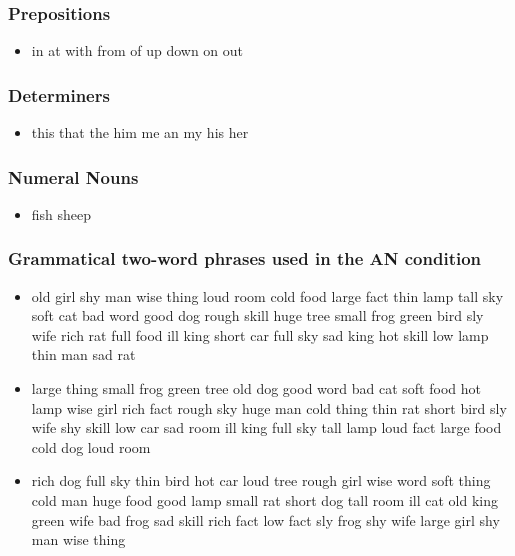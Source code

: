 \documentclass[10pt,letterpaper]{article}
\begin{document}
\begin{flushleft}
\subsubsection{Prepositions}
\begin{itemize}
  \item in
at
with
from
of
up
down
on
out
\end{itemize}

\subsubsection{Determiners}
\begin{itemize}
  \item this
that
the
him
me
an
my
his
her
\end{itemize}

\subsubsection{Numeral Nouns}
\begin{itemize}
  \item fish
  sheep
  
\end{itemize}

\subsubsection{Grammatical two-word phrases used in the AN condition}

\begin{itemize}
  \item old
girl
shy
man
wise
thing
loud
room
cold
food
large
fact
thin
lamp
tall
sky
soft
cat
bad
word
good
dog
rough
skill
huge
tree
small
frog
green
bird
sly
wife
rich
rat
full
food
ill
king
short
car
full
sky
sad
king
hot
skill
low
lamp
thin
man
sad
rat

  \item large
thing
small
frog
green
tree
old
dog
good
word
bad
cat
soft
food
hot
lamp
wise
girl
rich
fact
rough
sky
huge
man
cold
thing
thin
rat
short
bird
sly
wife
shy
skill
low
car
sad
room
ill
king
full
sky
tall
lamp
loud
fact
large
food
cold
dog
loud
room
  
  \item rich
dog
full
sky
thin
bird
hot
car
loud
tree
rough
girl
wise
word
soft
thing
cold
man
huge
food
good
lamp
small
rat
short
dog
tall
room
ill
cat
old
king
green
wife
bad
frog
sad
skill
rich
fact
low
fact
sly
frog
shy
wife
large
girl
shy
man
wise
thing


\end{itemize}
\end{flushleft}
\end{document}
